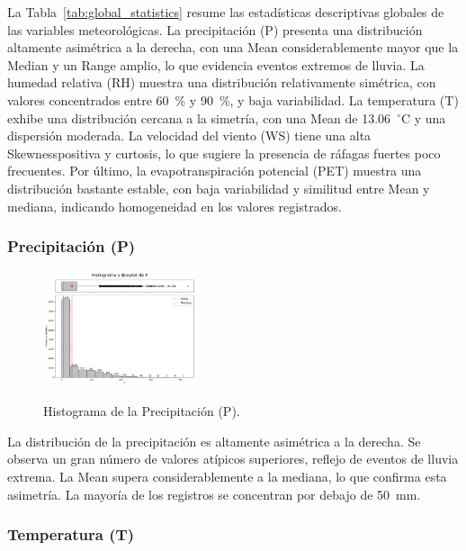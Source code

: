 La Tabla~\ref{tab:global_statistics} resume las estadísticas descriptivas globales de las variables meteorológicas. La precipitación (P) presenta una distribución altamente asimétrica a la derecha, con una Mean considerablemente mayor que la Median y un Range amplio, lo que evidencia eventos extremos de lluvia. La humedad relativa (RH) muestra una distribución relativamente simétrica, con valores concentrados entre 60~\% y 90~\%, y baja variabilidad. La temperatura (T) exhibe una distribución cercana a la simetría, con una Mean de 13.06~$^\circ$C y una dispersión moderada. La velocidad del viento (WS) tiene una alta Skewnesspositiva y curtosis, lo que sugiere la presencia de ráfagas fuertes poco frecuentes. Por último, la evapotranspiración potencial (PET) muestra una distribución bastante estable, con baja variabilidad y similitud entre Mean y mediana, indicando homogeneidad en los valores registrados.

\subsubsection*{Precipitación (P)}

\begin{figure}[H]
    \caption{Histograma de la Precipitación (P).}
    \centering
    \includegraphics[width=0.4\textwidth]{resultados/global/univariado/P_histograma.png}
    \label{fig:P_histograma}
\end{figure}

La distribución de la precipitación es altamente asimétrica a la derecha. Se observa un gran número de valores atípicos superiores, reflejo de eventos de lluvia extrema. La Mean supera considerablemente a la mediana, lo que confirma esta asimetría. La mayoría de los registros se concentran por debajo de \SI{50}{\milli\meter}.

\vspace{2em}

\subsubsection*{Temperatura (T)}

